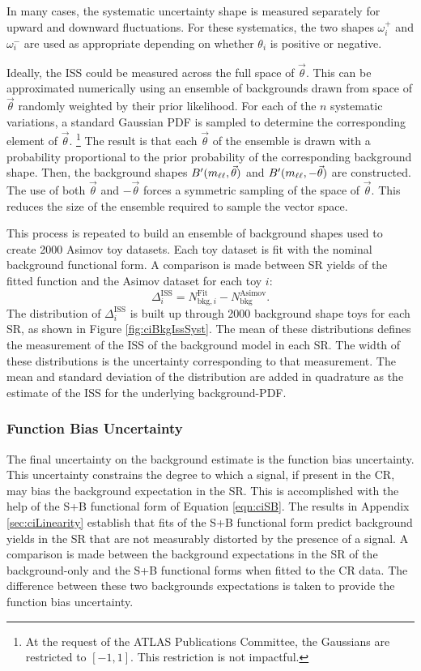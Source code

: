 In many cases, the systematic uncertainty shape is measured separately for upward and downward fluctuations.
For these systematics, the two shapes $\omega^+_i$ and $\omega^-_i$ are used as appropriate depending on whether $\theta_i$ is positive or negative.

Ideally, the ISS could be measured across the full space of $\vec{\theta}$.
This can be approximated numerically using an ensemble of backgrounds drawn from space of $\vec{\theta}$ randomly weighted by their prior likelihood.
For each of the $n$ systematic variations, a standard Gaussian PDF is sampled to determine the corresponding element of $\vec{\theta}$. \footnote{At the request of the ATLAS Publications Committee, the Gaussians are restricted to $[-1,1]$. This restriction is not impactful.}
The result is that each $\vec{\theta}$ of the ensemble is drawn with a probability proportional to the prior probability of the corresponding background shape.
Then, the background shapes $B'(m_{\ell\ell},\vec{\theta})$ and $B'(m_{\ell\ell},-\vec{\theta})$ are constructed.
The use of both $\vec{\theta}$ and $-\vec{\theta}$ forces a symmetric sampling of the space of $\vec{\theta}$. 
This reduces the size of the ensemble required to sample the vector space.

This process is repeated to build an ensemble of background shapes used to create 2000 Asimov toy datasets.
Each toy dataset is fit with the nominal background functional form.
A comparison is made between SR yields of the fitted function and the Asimov dataset for each toy $i$:
\begin{equation*}
    \Delta_i^\text{ISS}=N_{\text{bkg},i}^\text{Fit}-N_\text{bkg}^\text{Asimov}.
\end{equation*}
The distribution of $\Delta_i^\text{ISS}$ is built up through 2000 background shape toys for each SR, as shown in Figure \ref{fig:ciBkgIssSyst}.
The mean of these distributions defines the measurement of the ISS of the background model in each SR.
The width of these distributions is the uncertainty corresponding to that measurement.
The mean and standard deviation of the distribution are added in quadrature as the estimate of the ISS for the underlying background-PDF.

\subsubsection{Function Bias Uncertainty}

The final uncertainty on the background estimate is the function bias uncertainty.
This uncertainty constrains the degree to which a signal, if present in the CR, may bias the background expectation in the SR.
This is accomplished with the help of the S+B functional form of Equation \ref{eqn:ciSB}.
The results in Appendix \ref{sec:ciLinearity} establish that fits of the S+B functional form predict background yields in the SR that are not measurably distorted by the presence of a signal.
A comparison is made between the background expectations in the SR of the background-only and the S+B functional forms when fitted to the CR data.
The difference between these two backgrounds expectations is taken to provide the function bias uncertainty.

